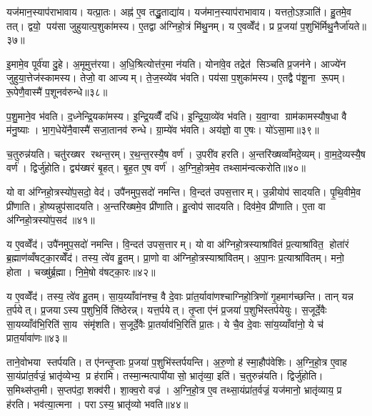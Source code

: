 यज॑मान॒स्याप॑राभावाय। यत्प्रा॒तः। अह्न॑ ए॒व तद्धु॒ताद्या॑य। यज॑मान॒स्याप॑राभावाय। यत्ततो॒ऽश़्ञाति॑। हु॒तमे॒व तत्। द्वयो॒ पय॑सा जुहुयात्प॒शुका॑मस्य। ए॒तद्वा अ॑ग्निहो॒त्रं मि॑थु॒नम्। य ए॒वव्वेँद॑। प्र प्र॒जया॑ प॒शुभि॑र्मिथु॒नैर्जा॑यते॥३७॥

इ॒मामे॒व पूर्व॑या दु॒हे। अ॒मूमुत्त॑रया। अ॒धि॒श्रित्योत्त॑र॒मा न॑यति। योना॑वे॒व तद्रेत॑ सिञ्चति प्र॒जन॑ने। आज्ये॑न जुहुया॒त्तेज॑स्कामस्य। तेजो॒ वा आज्यम्। ते॒ज॒स्व्ये॑व भ॑वति। पय॑सा प॒शुका॑मस्य। ए॒तद्वै प॑शू॒ना रू॒पम्। रू॒पेणै॒वास्मै॑ प॒शूनव॑रुन्धे॥३८॥

प॒शु॒माने॒व भ॑वति। द॒ध्नेन्द्रि॒यका॑मस्य। इ॒न्द्रि॒यव्वैँ दधि॑। इ॒न्द्रि॒या॒व्ये॑व भ॑वति। य॒वा॒ग्वा ग्राम॑कामस्यौष॒धा वै म॑नु॒ष्याः। भा॒ग॒धेये॑नै॒वास्मै॑ सजा॒तानव॑ रुन्धे। ग्रा॒म्ये॑व भ॑वति। अय॑ज्ञो॒ वा ए॒षः। यो॑ऽसा॒मा॥३९॥

च॒तुरुन्न॑यति। चतु॑रख्षर रथन्त॒रम्। र॒थ॒न्त॒रस्यै॒ष वर्ण॑। उ॒परी॑व हरति। अ॒न्तरि॑ख्षव्वाँमदे॒व्यम्। वा॒म॒दे॒व्यस्यै॒ष वर्ण॑। द्विर्जु॑होति। द्व्य॑ख्षरं बृ॒हत्। बृ॒ह॒त ए॒ष वर्ण॑। अ॒ग्नि॒हो॒त्रमे॒व तथ्साम॑न्वत्करोति॥४०॥

यो वा अ॑ग्निहो॒त्रस्यो॑प॒सदो॒ वेद॑। उपै॑नमुप॒सदो॑ नमन्ति। वि॒न्दत॑ उपस॒त्तारम्। उ॒न्नीयोप॑ सादयति। पृ॒थि॒वीमे॒व प्री॑णाति। हो॒ष्यन्नुप॑सादयति। अ॒न्तरि॑ख्षमे॒व प्री॑णाति। हु॒त्वोप॑ सादयति। दिव॑मे॒व प्री॑णाति। ए॒ता वा अ॑ग्निहो॒त्रस्यो॑प॒सद॑॥४१॥

य ए॒वव्वेँद॑। उपै॑नमुप॒सदो॑ नमन्ति। वि॒न्दत॑ उपस॒त्तारम्। यो वा अ॑ग्निहो॒त्रस्याश्रा॑वितं प्र॒त्याश्रा॑वित॒ होता॑रं ब्र॒ह्माण॑व्वँषट्का॒रव्वेँद॑। तस्य॒ त्वे॑व हु॒तम्। प्रा॒णो वा अ॑ग्निहो॒त्रस्याश्रा॑वितम्। अ॒पा॒नः प्र॒त्याश्रा॑वितम्। मनो॒ होता। चख्षु॑र्ब्र॒ह्मा। नि॒मे॒षो व॑षट्का॒रः॥४२॥

य ए॒वव्वेँद॑। तस्य॒ त्वे॑व हु॒तम्। सा॒य॒य्याँवा॑नश्च॒ वै दे॒वाः प्रा॑त॒र्यावा॑णश्चाग्निहो॒त्रिणो॑ गृ॒हमाग॑च्छन्ति। तान् यन्न त॒र्पयेत्। प्र॒जयाऽस्य प॒शुभि॒र्वि ति॑ष्ठेरन्न्। यत्त॒र्पयेत्। तृ॒प्ता ए॑नं प्र॒जया॑ प॒शुभि॑स्तर्पयेयुः। स॒जूर्दे॒वैः सा॒यय्याँव॑भि॒रिति॑ सा॒य संमृ॑शति। स॒जूर्दे॒वैः प्रा॒तर्याव॑भि॒रिति॑ प्रा॒तः। ये चै॒व दे॒वाः सा॑य॒य्याँवा॑नो॒ ये च॑ प्रात॒र्यावा॑णः॥४३॥

ताने॒वोभया स्तर्पयति। त ए॑नन्तृ॒प्ताः प्र॒जया॑ प॒शुभि॑स्तर्पयन्ति। अ॒रु॒णो ह॑ स्मा॒हौप॑वेशिः। अ॒ग्नि॒हो॒त्र ए॒वाह सा॒यंप्रा॑त॒र्वज्रं॒ भ्रातृ॑व्येभ्य॒ प्र ह॑रामि। तस्मा॒न्मत्पापी॑यासो॒ भ्रातृ॑व्या॒ इति॑। च॒तुरुन्न॑यति। द्विर्जु॑होति। स॒मिथ्स॑प्त॒मी। स॒प्तप॑दा॒ शक्व॑री। शा॒क्व॒रो वज्र॑। अ॒ग्नि॒हो॒त्र ए॒व तथ्सा॒यंप्रा॑त॒र्वज्रं॒ यज॑मानो॒ भ्रातृ॑व्याय॒ प्र ह॑रति। भव॑त्या॒त्मना। पराऽस्य॒ भ्रातृ॑व्यो भवति॥४४॥

